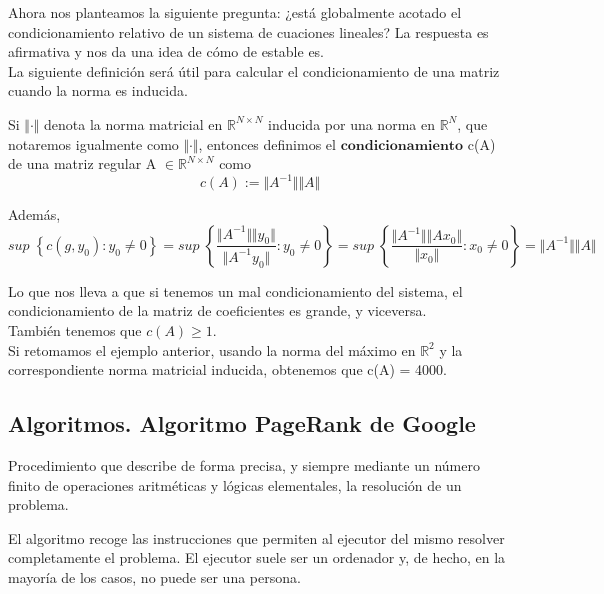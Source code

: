 Ahora nos planteamos la siguiente pregunta: ¿está globalmente acotado el condicionamiento relativo de un sistema de cuaciones lineales? La respuesta es afirmativa y nos da una idea de cómo de estable es.\\

La siguiente definición será útil para calcular el condicionamiento de una matriz cuando la norma es inducida.

\begin{ndef}
Si $\Vert \cdot \Vert$ denota la norma matricial en $\mathbb{R}^{N \times N}$ inducida por una norma en $\mathbb{R}^N$, que notaremos igualmente como $\Vert \cdot \Vert$, entonces definimos el $\textbf{condicionamiento}$ c(A) de una matriz regular A $\in \mathbb{R}^{N \times N}$ como
\[ c(A) := \Vert A^{-1} \Vert \Vert A \Vert \]
\end{ndef}

Además,
\[ sup \; \left\lbrace c(g, y_0) : y_0 \neq 0 \right\rbrace = sup \; \left\lbrace \frac{\Vert A^{-1} \Vert \Vert y_0 \Vert}{\Vert A^{-1}y_0 \Vert} : y_0 \neq 0 \right\rbrace = sup \; \left\lbrace \frac{\Vert A^{-1} \Vert \Vert Ax_0 \Vert}{\Vert x_0 \Vert} : x_0 \neq 0 \right\rbrace = \Vert A^{-1} \Vert \Vert A \Vert \]

Lo que nos lleva a que si tenemos un mal condicionamiento del sistema, el condicionamiento de la matriz de coeficientes es grande, y viceversa.\\
También tenemos que $c(A) \geq 1$.\\
Si retomamos el ejemplo anterior, usando la norma del máximo en $\mathbb{R}^2$ y la correspondiente norma matricial inducida, obtenemos que c(A) = 4000.

\subsection{Algoritmos. Algoritmo PageRank de Google}

\begin{ndef}[Algoritmo]
Procedimiento que describe de forma precisa, y siempre mediante un número finito de operaciones aritméticas y lógicas elementales, la resolución de un problema.
\end{ndef}

El algoritmo recoge las instrucciones que permiten al ejecutor del mismo resolver completamente el problema. El ejecutor suele ser un ordenador y, de hecho, en la mayoría de los casos, no puede ser una persona.

